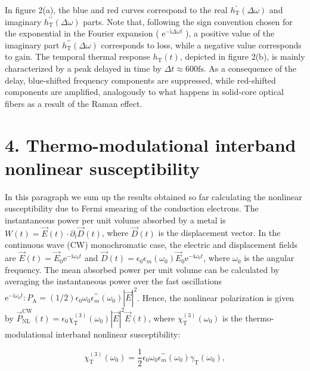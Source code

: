 \documentclass[10pt]{article}
\begin{document}
In figure 2(a), the blue and red curves correspond to the real $h_{\mathrm{T}}^{\prime}(\Delta \omega)$ and imaginary $h_{\mathrm{T}}^{\prime \prime}(\Delta \omega)$ parts. Note that, following the sign convention chosen for the exponential in the Fourier expansion ( $\mathrm{e}^{-\mathrm{i} \Delta \omega t}$ ), a positive value of the imaginary part $h_{\mathrm{T}}^{\prime \prime}(\Delta \omega)$ corresponds to loss, while a negative value corresponds to gain. The temporal thermal response $h_{\mathrm{T}}(t)$, depicted in figure 2(b), is mainly characterized by a peak delayed in time by $\Delta t \approx 600 \mathrm{fs}$. As a consequence of the delay, blue-shifted frequency components are suppressed, while red-shifted components are amplified, analogously to what happens in solid-core optical fibers as a result of the Raman effect.

\section*{4. Thermo-modulational interband nonlinear susceptibility}
In this paragraph we sum up the results obtained so far calculating the nonlinear susceptibility due to Fermi smearing of the conduction electrons. The instantaneous power per unit volume absorbed by a metal is $W(t)=\vec{E}(t) \cdot \partial_{t} \vec{D}(t)$, where $\vec{D}(t)$ is the displacement vector. In the continuous wave (CW) monochromatic case, the electric and displacement fields are $\vec{E}(t)=\vec{E}_{0} \mathrm{e}^{-\mathrm{i} \omega_{0} t}$ and $\vec{D}(t)=\epsilon_{0} \epsilon_{m}\left(\omega_{0}\right) \vec{E}_{0} \mathrm{e}^{-\mathrm{i} \omega_{0} t}$, where $\omega_{0}$ is the angular frequency. The mean absorbed power per unit volume can be calculated by averaging the instantaneous power over the fast oscillations $\mathrm{e}^{-\mathrm{i} \omega_{0} t}: P_{\mathrm{A}}=(1 / 2) \epsilon_{0} \omega_{0} \epsilon_{m}^{\prime \prime}\left(\omega_{0}\right)|\vec{E}|^{2}$. Hence, the nonlinear polarization is given by $\vec{P}_{\mathrm{NL}}^{\mathrm{CW}}(t)=\epsilon_{0} \chi_{\mathrm{T}}^{(3)}\left(\omega_{0}\right)|\vec{E}|^{2} \vec{E}(t)$, where $\chi_{\mathrm{T}}^{(3)}\left(\omega_{0}\right)$ is the thermo-modulational interband nonlinear susceptibility:


\begin{equation*}
\chi_{\mathrm{T}}^{(3)}\left(\omega_{0}\right)=\frac{1}{2} \epsilon_{0} \omega_{0} \epsilon_{m}^{\prime \prime}\left(\omega_{0}\right) \gamma_{\mathrm{T}}\left(\omega_{0}\right), \tag{10}
\end{equation*}
\end{document}

